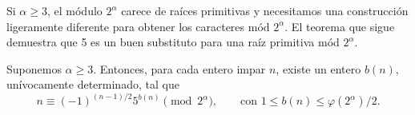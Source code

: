 \documentclass[12pt,a4paper]{book}
\begin{document}
    Si $\alpha\geq3$, el módulo $2^{\alpha}$ carece de raíces primitivas y necesitamos una
    construcción ligeramente diferente para obtener los caracteres mód $2^{\alpha}$. El
    teorema que sigue demuestra que 5 es un buen substituto para una raíz primitiva mód
    $2^{\alpha}$.

    \begin{teorema}\label{teo:10-11}
        Suponemos $\alpha\geq3$. Entonces, para cada entero impar $n$, existe un entero
        $b(n)$, unívocamente determinado, tal que
        \begin{equation*}
            n\equiv(-1)^{(n-1)/2}5^{b(n)}\pmod{2^{\alpha}},\qquad\text{con }1\leq b(n)\leq\varphi(2^{\alpha})/2.
        \end{equation*}
    \end{teorema}
\end{document}
